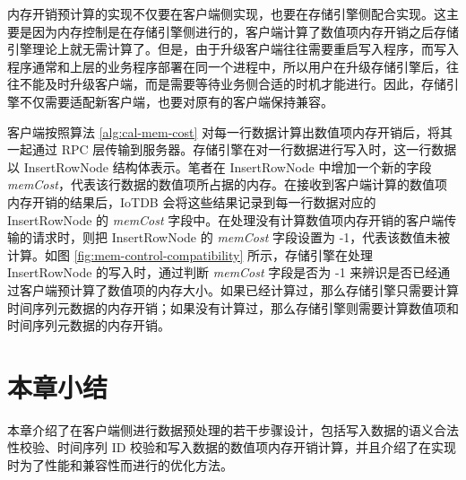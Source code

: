 内存开销预计算的实现不仅要在客户端侧实现，也要在存储引擎侧配合实现。这主要是因为内存控制是在存储引擎侧进行的，客户端计算了数值项内存开销之后存储引擎理论上就无需计算了。但是，由于升级客户端往往需要重启写入程序，而写入程序通常和上层的业务程序部署在同一个进程中，所以用户在升级存储引擎后，往往不能及时升级客户端，而是需要等待业务侧合适的时机才能进行。因此，存储引擎不仅需要适配新客户端，也要对原有的客户端保持兼容。


客户端按照算法 \ref{alg:cal-mem-cost} 对每一行数据计算出数值项内存开销后，将其一起通过 RPC 层传输到服务器。存储引擎在对一行数据进行写入时，这一行数据以 InsertRowNode 结构体表示。笔者在 InsertRowNode 中增加一个新的字段 \emph{memCost}，代表该行数据的数值项所占据的内存。在接收到客户端计算的数值项内存开销的结果后，IoTDB 会将这些结果记录到每一行数据对应的 InsertRowNode 的 \emph{memCost} 字段中。在处理没有计算数值项内存开销的客户端传输的请求时，则把 InsertRowNode 的 \emph{memCost} 字段设置为 -1，代表该数值未被计算。如图 \ref{fig:mem-control-compatibility} 所示，存储引擎在处理 InsertRowNode 的写入时，通过判断 \emph{memCost} 字段是否为 -1 来辨识是否已经通过客户端预计算了数值项的内存大小。如果已经计算过，那么存储引擎只需要计算时间序列元数据的内存开销；如果没有计算过，那么存储引擎则需要计算数值项和时间序列元数据的内存开销。

\section{本章小结}
本章介绍了在客户端侧进行数据预处理的若干步骤设计，包括写入数据的语义合法性校验、时间序列 ID 校验和写入数据的数值项内存开销计算，并且介绍了在实现时为了性能和兼容性而进行的优化方法。